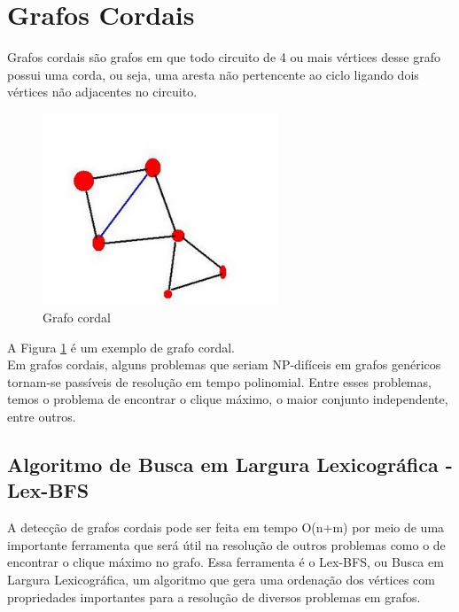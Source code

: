 \documentclass{article}
\begin{document}
\section{Grafos Cordais}

Grafos cordais são grafos em que todo
circuito de 4 ou mais vértices desse grafo possui uma
corda, ou seja, uma aresta não pertencente ao
ciclo ligando dois vértices não adjacentes no
circuito.

\begin{figure}[h]
    \center
    \caption{Grafo cordal}
    \label{fig:cordal}
    \includegraphics[width=7cm]{img/cordal01.jpg}
\end{figure}


A Figura \ref{fig:cordal} é um exemplo de grafo cordal.\\


Em grafos cordais, alguns problemas que seriam
NP-difíceis em grafos genéricos tornam-se passíveis de
resolução em tempo polinomial. Entre esses problemas, temos o problema de
encontrar o clique máximo, o maior
conjunto independente, entre outros.


\subsection{ Algoritmo de Busca em Largura Lexicográfica - Lex-BFS }


A detecção de grafos cordais pode ser feita em tempo O(n+m) por meio de uma
importante ferramenta que será útil na resolução de outros problemas como o
de encontrar o clique máximo no grafo. Essa ferramenta é o
Lex-BFS, ou
Busca em Largura Lexicográfica, um
algoritmo que gera uma ordenação dos vértices com propriedades
importantes para a resolução de diversos problemas em grafos.
\end{document}
